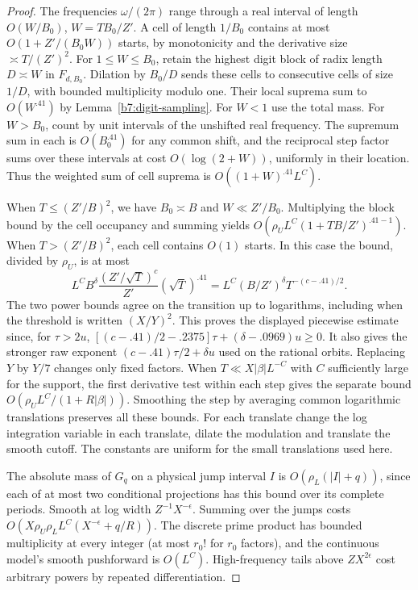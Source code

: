 \documentclass[11pt,a4paper]{article}
\theoremstyle{paperplain}
\numberwithin{equation}{section}
\begin{document}
\begin{proof}
The frequencies $\omega/(2\pi)$ range through a real interval of
length $O(W/B_0)$, $W=TB_0/Z'$. A cell of length $1/B_0$ contains
at most $O(1+Z'/(B_0W))$ starts, by monotonicity and the derivative
size $\asymp T/(Z')^2$. For $1\le W\le B_0$, retain the highest
digit block of radix length $D\asymp W$ in $F_{d,B_0}$.
Dilation by $B_0/D$ sends these cells to consecutive cells of
size $1/D$, with bounded multiplicity modulo one. Their local
suprema sum to $O(W^{.41})$ by Lemma~\ref{b7:digit-sampling}.
For $W<1$ use the total mass. For $W>B_0$, count by unit intervals
of the unshifted real frequency. The supremum sum in each is
$O(B_0^{.41})$ for any common shift, and the reciprocal step
factor sums over these intervals at cost $O(\log(2+W))$, uniformly
in their location. Thus the weighted sum of cell suprema is
$O((1+W)^{.41}L^C)$.

When $T\le (Z'/B)^2$, we have $B_0\asymp B$ and $W\ll Z'/B_0$.
Multiplying the block bound by the cell occupancy and summing yields
$O(\rho_U L^C(1+TB/Z')^{.41-1})$.
When $T>(Z'/B)^2$, each cell contains $O(1)$ starts.
In this case the bound, divided by $\rho_U$, is at most
\[
 L^C B^\delta\frac{(Z'/\sqrt T)^c}{Z'}(\sqrt T)^{.41}
 =L^C(B/Z')^\delta T^{-(c-.41)/2}.
\]
The two power bounds agree on the transition up to logarithms,
including when the threshold is written $(X/Y)^2$.
This proves the displayed piecewise estimate since, for $\tau>2u$,
$[(c-.41)/2-.2375]\tau+ (\delta-.0969)u\ge0$.
It also gives the stronger raw exponent
$(c-.41)\tau/2+\delta u$ used on the rational orbits.
Replacing $Y$ by $Y/7$ changes only fixed factors. When
$T\ll X|\beta|L^{-C}$ with $C$ sufficiently large for the support,
the first derivative test within each step gives the separate bound
$O(\rho_U L^C/(1+R|\beta|))$. Smoothing the step by averaging
common logarithmic translations preserves all these bounds. For each translate change
the log integration variable in each translate, dilate the modulation
and translate the smooth cutoff. The constants are uniform for the
small translations used here.

The absolute mass of \(G_q\) on a physical jump interval \(I\) is \(O(\rho_L(|I|+q))\), since each
of at most two conditional projections has this bound over its complete periods. Smooth at log
width \(Z^{-1}X^{-\epsilon}\). Summing over the jumps costs \(O(X\rho_U\rho_L
L^C(X^{-\epsilon}+q/R))\). The discrete prime product has bounded multiplicity at every integer
(at most \(r_0!\) for \(r_0\) factors), and the continuous model's smooth pushforward is
\(O(L^C)\). High-frequency tails above \(ZX^{2\epsilon}\) cost arbitrary powers by repeated
differentiation.


\end{proof}
\end{document}
